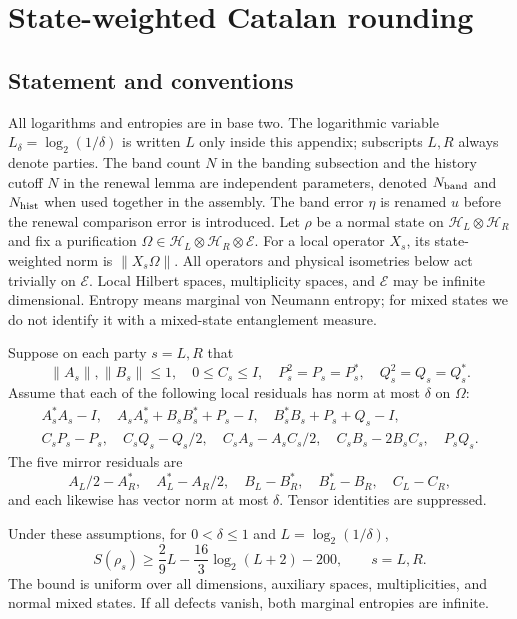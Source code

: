 \section{State-weighted Catalan rounding}\label{sec:rounding}
\subsection{Statement and conventions}
All logarithms and entropies are in base two. The logarithmic variable $L_\delta=\log_2(1/\delta)$ is written $L$ only inside this appendix; subscripts $L,R$ always denote parties. The band count $N$ in the banding subsection and the history cutoff $N$ in the renewal lemma are independent parameters, denoted $N_{\rm band}$ and $N_{\rm hist}$ when used together in the assembly. The band error $\eta$ is renamed $u$ before the renewal comparison error is introduced. Let $\rho$ be a normal state on $\mathcal H_L\otimes\mathcal H_R$ and fix a purification $\Omega\in\mathcal H_L\otimes\mathcal H_R\otimes\mathcal E$. For a local operator $X_s$, its state-weighted norm is $\|X_s\Omega\|$. All operators and physical isometries below act trivially on $\mathcal E$. Local Hilbert spaces, multiplicity spaces, and $\mathcal E$ may be infinite dimensional. Entropy means marginal von Neumann entropy; for mixed states we do not identify it with a mixed-state entanglement measure.

Suppose on each party $s=L,R$ that
\[
 \|A_s\|,\|B_s\|\le1,\quad 0\le C_s\le I,
 \quad P_s^2=P_s=P_s^*,\quad Q_s^2=Q_s=Q_s^*.
\]
Assume that each of the following local residuals has norm at most $\delta$ on $\Omega$:
\begin{equation}\label{rnd:eq:local-input}
\begin{gathered}
 A_s^*A_s-I,\quad A_sA_s^*+B_sB_s^*+P_s-I,\quad
 B_s^*B_s+P_s+Q_s-I,\\
 C_sP_s-P_s,\quad C_sQ_s-Q_s/2,\quad
 C_sA_s-A_sC_s/2,\quad C_sB_s-2B_sC_s,\quad P_sQ_s.
\end{gathered}
\end{equation}
The five mirror residuals are
\begin{equation}\label{rnd:eq:mirror-input}
 A_L/2-A_R^*,\quad A_L^*-A_R/2,\quad
 B_L-B_R^*,\quad B_L^*-B_R,\quad C_L-C_R,
\end{equation}
and each likewise has vector norm at most $\delta$. Tensor identities are suppressed.

\begin{theorem}\label{rnd:thm:rounding}
Under these assumptions, for $0<\delta\le1$ and $L=\log_2(1/\delta)$,
\begin{equation}\label{rnd:eq:main}
 S(\rho_s)\ge \frac29L-\frac{16}{3}\log_2(L+2)-200,
 \qquad s=L,R.
\end{equation}
The bound is uniform over all dimensions, auxiliary spaces, multiplicities, and normal mixed states. If all defects vanish, both marginal entropies are infinite.
\end{theorem}

